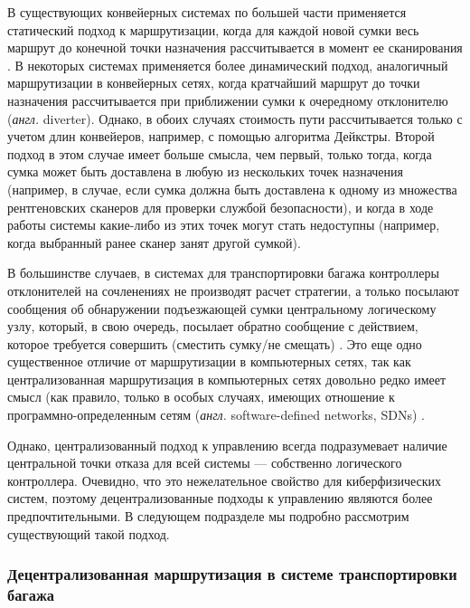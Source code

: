 \documentclass[specification,annotation,times]{itmo-student-thesis}
\theoremstyle{definition}
\begin{document}
В существующих конвейерных системах по большей части применяется статический
подход к маршрутизации, когда для каждой новой сумки весь маршрут до конечной
точки назначения рассчитывается в момент ее сканирования
\cite{johnstone2009status}.
В некоторых системах применяется более динамический подход, аналогичный
маршрутизации в конвейерных сетях, когда кратчайший маршрут до точки назначения
рассчитывается при приближении сумки к очередному отклонителю (\textit{англ.}
diverter)\cite{hallenborg2007decentralized}. Однако, в обоих случаях стоимость
пути рассчитывается только с учетом длин конвейеров, например, с помощью
алгоритма Дейкстры. Второй подход в этом случае имеет больше смысла, чем первый,
только тогда, когда сумка может быть доставлена в любую из нескольких точек
назначения (например, в случае, если сумка должна быть доставлена к одному из
множества рентгеновских сканеров для проверки службой безопасности), и когда в
ходе работы системы какие-либо из этих точек могут стать недоступны (например,
когда выбранный ранее сканер занят другой сумкой).

В большинстве случаев, в системах для транспортировки багажа контроллеры
отклонителей на сочленениях не производят расчет стратегии, а только посылают
сообщения об обнаружении подъезжающей сумки центральному логическому узлу,
который, в свою очередь, посылает обратно сообщение с действием, которое
требуется совершить (сместить сумку/не смещать)
\cite{hallenborg2007decentralized, johnstone2009status}. Это еще одно
существенное отличие от маршрутизации в компьютерных сетях, так как
централизованная маршрутизация в компьютерных сетях довольно редко имеет смысл
(как правило, только в особых случаях, имеющих отношение к
программно-определенным сетям (\textit{англ.} software-defined networks, SDNs)
\cite{mao2017routing, wang2018machine}.

Однако, централизованный подход к управлению всегда подразумевает наличие
центральной точки отказа для всей системы --- собственно логического
контроллера. Очевидно, что это нежелательное свойство для киберфизических
систем, поэтому децентрализованные подходы к управлению являются более
предпочтительными. В следующем подразделе мы подробно рассмотрим существующий
такой подход.

\subsubsection{Децентрализованная маршрутизация в системе транспортировки
  багажа}\label{vyatkin-method}
\end{document}
